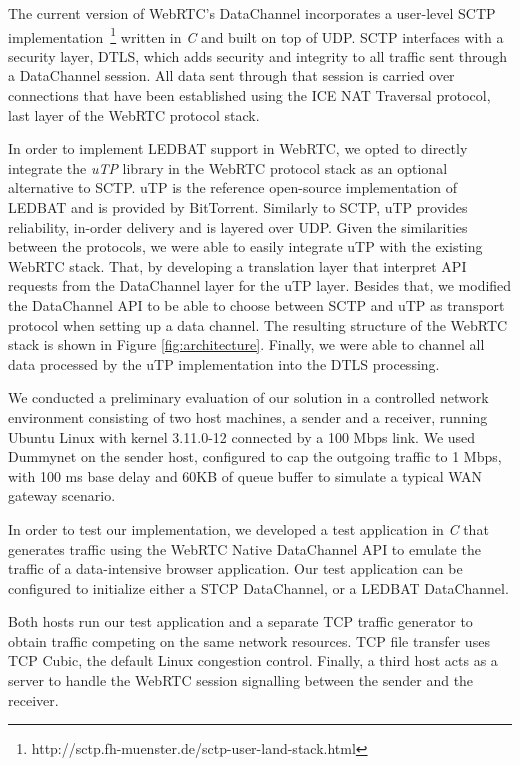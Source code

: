 \documentclass{sig-alternate}
\begin{document}
The current version of WebRTC's DataChannel incorporates a user-level SCTP
implementation~\footnote{http://sctp.fh-muenster.de/sctp-user-land-stack.html} written in \textit{C} and built
on top of UDP. SCTP interfaces with a security layer, DTLS, which adds security
and integrity to all traffic sent through a DataChannel session.  All data sent through
that session is carried over connections that have been established using the ICE NAT
Traversal protocol, last layer of the WebRTC protocol stack.


In order to implement LEDBAT support in WebRTC, we opted to directly integrate the
\textit{uTP} library \cite{utp-repo} in the WebRTC protocol stack as an optional
alternative to SCTP. uTP is the reference open-source implementation of LEDBAT and is
provided by BitTorrent. Similarly to SCTP, uTP provides reliability, in-order delivery
and is layered over UDP. Given the similarities between the protocols, we were able to
easily integrate uTP with the existing WebRTC stack. That, by developing a translation
layer that interpret API requests from the DataChannel layer for the uTP layer. Besides
that, we modified the DataChannel API to be able to choose between SCTP and uTP as
transport protocol when setting up a data channel. The resulting structure of the WebRTC
stack is shown in Figure \ref{fig:architecture}. Finally, we were able to channel all data
processed by the uTP implementation into the DTLS processing.

\label{sec:architecture}


We conducted a preliminary evaluation of our solution in a controlled network environment
consisting of two host machines, a sender and a receiver, running Ubuntu Linux with kernel
3.11.0-12 connected by a 100 Mbps link. We used Dummynet on the sender host,
configured to cap the outgoing traffic to 1 Mbps, with 100 ms base delay and 60KB of queue
buffer to simulate a typical WAN gateway scenario. 

In order to test our implementation, we developed a test application in \textit{C} that
generates traffic using the WebRTC Native DataChannel API to emulate the traffic
of a data-intensive browser application. Our test application can be configured
to initialize either a STCP DataChannel, or a LEDBAT DataChannel.

Both hosts run our test application and a separate TCP traffic generator to obtain traffic
competing on the same network resources. TCP file transfer uses TCP Cubic, the default
Linux congestion control. Finally, a third host acts as a server to handle the WebRTC
session signalling between the sender and the receiver.
\end{document}
